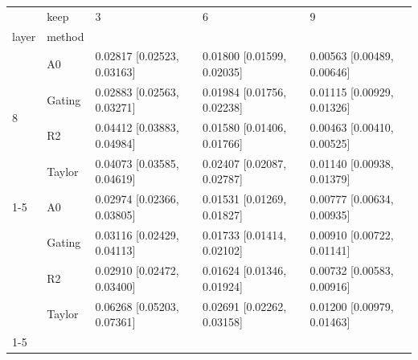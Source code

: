 \begin{tabular}{lllll}
\toprule
 & keep & 3 & 6 & 9 \\
layer & method &  &  &  \\
\midrule
\multirow[t]{4}{*}{8} & A0 & 0.02817 [0.02523, 0.03163] & 0.01800 [0.01599, 0.02035] & 0.00563 [0.00489, 0.00646] \\
 & Gating & 0.02883 [0.02563, 0.03271] & 0.01984 [0.01756, 0.02238] & 0.01115 [0.00929, 0.01326] \\
 & R2 & 0.04412 [0.03883, 0.04984] & 0.01580 [0.01406, 0.01766] & 0.00463 [0.00410, 0.00525] \\
 & Taylor & 0.04073 [0.03585, 0.04619] & 0.02407 [0.02087, 0.02787] & 0.01140 [0.00938, 0.01379] \\
\cline{1-5}
\multirow[t]{4}{*}{11} & A0 & 0.02974 [0.02366, 0.03805] & 0.01531 [0.01269, 0.01827] & 0.00777 [0.00634, 0.00935] \\
 & Gating & 0.03116 [0.02429, 0.04113] & 0.01733 [0.01414, 0.02102] & 0.00910 [0.00722, 0.01141] \\
 & R2 & 0.02910 [0.02472, 0.03400] & 0.01624 [0.01346, 0.01924] & 0.00732 [0.00583, 0.00916] \\
 & Taylor & 0.06268 [0.05203, 0.07361] & 0.02691 [0.02262, 0.03158] & 0.01200 [0.00979, 0.01463] \\
\cline{1-5}
\bottomrule
\end{tabular}
